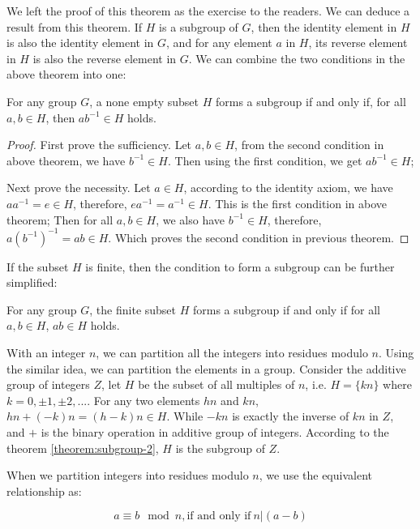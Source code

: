 \documentclass{article}
\begin{document}
We left the proof of this theorem as the exercise to the readers. We can deduce a result from this theorem. If $H$ is a subgroup of $G$, then the identity element in $H$ is also the identity element in $G$, and for any element $a$ in $H$, its reverse element in $H$ is also the reverse element in $G$. We can combine the two conditions in the above theorem into one:

\begin{theorem}
For any group $G$, a none empty subset $H$ forms a subgroup if and only if, for all $a, b \in H$, then $ab^{-1} \in H$ holds.
\label{theorem:subgroup-2}
\end{theorem}

\begin{proof}
First prove the sufficiency. Let $a, b \in H$, from the second condition in above theorem, we have $b^{-1} \in H$. Then using the first condition, we get $ab^{-1} \in H$;

Next prove the necessity. Let $a \in H$, according to the identity axiom, we have $aa^{-1} = e \in H$, therefore, $ea^{-1} = a^{-1} \in H$. This is the first condition in above theorem; Then for all $a, b \in H$, we also have $b^{-1} \in H$, therefore, $a(b^{-1})^{-1} = ab \in H$. Which proves the second condition in previous theorem.
\end{proof}

If the subset $H$ is finite, then the condition to form a subgroup can be further simplified:

\begin{theorem}
For any group $G$, the finite subset $H$ forms a subgroup if and only if for all $a, b \in H$, $ab \in H$ holds.
\end{theorem}

With an integer $n$, we can partition all the integers into residues modulo $n$. Using the similar idea, we can partition the elements in a group. Consider the additive group of integers $Z$, let $H$ be the subset of all multiples of $n$, i.e. $H = \{ kn \}$ where $k = 0, \pm 1, \pm 2, ...$. For any two elements $hn$ and $kn$, $hn + (-k)n = (h - k)n \in H$. While $-kn$ is exactly the inverse of $kn$ in $Z$, and $+$ is the binary operation in additive group of integers. According to the theorem \ref{theorem:subgroup-2}, $H$ is the subgroup of $Z$.

When we partition integers into residues modulo $n$, we use the equivalent relationship as:

\[
a \equiv b \mod n, \text{if and only if}\ n | (a - b)
\]
\end{document}
